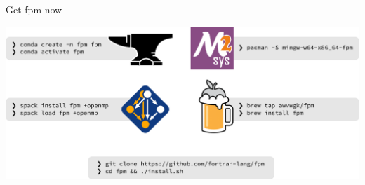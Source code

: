 \documentclass[lualatex,10pt,aspectratio=169]{beamer}
\begin{document}
\begin{frame}{Get fpm now}
   \begin{center}
      \includegraphics[width=.9\textwidth]{Figures/get-fpm.pdf}
   \end{center}
\end{frame}
\end{document}

